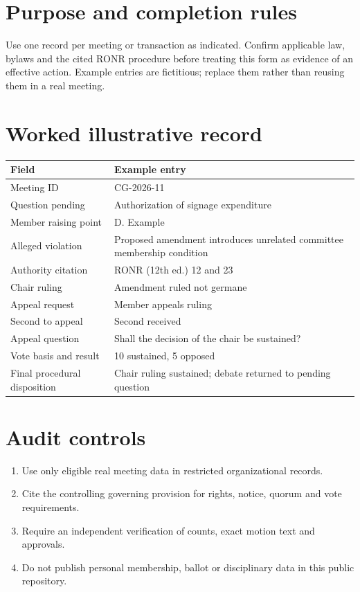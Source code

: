 \documentclass[11pt]{article}
\begin{document}
\SuiteOpen
\section{Purpose and completion rules}
Use one record per meeting or transaction as indicated. Confirm applicable law, bylaws and the cited RONR procedure before treating this form as evidence of an effective action. Example entries are fictitious; replace them rather than reusing them in a real meeting.

\section{Worked illustrative record}
\begin{longtable}{@{}p{.38\linewidth}p{.55\linewidth}@{}}\toprule Field & Example entry\\\midrule\endhead


Meeting ID & CG-2026-11\\
Question pending & Authorization of signage expenditure\\
Member raising point & D. Example\\
Alleged violation & Proposed amendment introduces unrelated committee membership condition\\
Authority citation & RONR (12th ed.) 12 and 23\\
Chair ruling & Amendment ruled not germane\\
Appeal request & Member appeals ruling\\
Second to appeal & Second received\\
Appeal question & Shall the decision of the chair be sustained?\\
Vote basis and result & 10 sustained, 5 opposed\\
Final procedural disposition & Chair ruling sustained; debate returned to pending question\\
\bottomrule\end{longtable}
\section{Audit controls}
\begin{enumerate}[leftmargin=*,itemsep=4pt]
\item Use only eligible real meeting data in restricted organizational records.
\item Cite the controlling governing provision for rights, notice, quorum and vote requirements.
\item Require an independent verification of counts, exact motion text and approvals.
\item Do not publish personal membership, ballot or disciplinary data in this public repository.
\end{enumerate}
\end{document}

